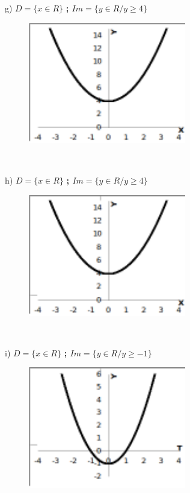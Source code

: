 \begin{respostas}{7}
	g)  \( D= \{ x \in R \}  \) \textbf{; \( Im= \{ y \in R/y \geq 4 \}  \) }

	\begin{figure}[H]
		\begin{Center}
			\includegraphics[width=2.71in,height=2.09in]{capitulos/outras_funcoes/media/image92.pdf}
		\end{Center}
	\end{figure}

~~

	h)  \( D= \{ x \in R \}  \) \textbf{; \( Im= \{ y \in R/y \geq 4 \}  \) }

	\begin{figure}[H]
		\begin{Center}
			\includegraphics[width=2.71in,height=2.09in]{capitulos/outras_funcoes/media/image93.pdf}
		\end{Center}
	\end{figure}

~~

	i)  \( D= \{ x \in R \}  \) \textbf{; \( Im= \{ y \in R/y \geq -1 \}  \) }

	\begin{figure}[H]
		\begin{Center}
			\includegraphics[width=2.71in,height=2.09in]{capitulos/outras_funcoes/media/image94.pdf}
		\end{Center}
	\end{figure}


\end{respostas}
